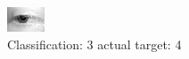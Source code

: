 \begin{figure}[h!]
\begin{center}
\includegraphics[width=0.60\columnwidth]{figures/ID2702_class_3_target_4.png}
\end{center}
\caption{ Classification: 3 actual target: 4}
\label{fig:ID2702_class_3_target_4}
\end{figure}
